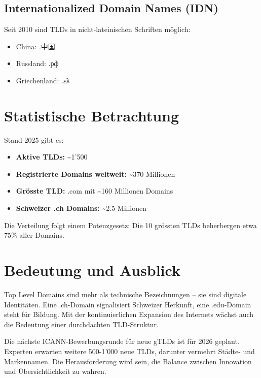 \documentclass[
  nswissgerman,
  a4paper,
  DIV=11,
  numbers=noendperiod,
  ngerman]{scrreprt}
\providecommand{\tightlist}{%
  \setlength{\itemsep}{0pt}\setlength{\parskip}{0pt}}
\begin{document}
\subsection{Internationalized Domain Names
(IDN)}\label{internationalized-domain-names-idn}

Seit 2010 sind TLDs in nicht-lateinischen Schriften möglich:

\begin{itemize}
\tightlist
\item
  China: .中国
\item
  Russland: .рф
\item
  Griechenland: .ελ
\end{itemize}

\section{Statistische Betrachtung}\label{statistische-betrachtung}

Stand 2025 gibt es:

\begin{itemize}
\tightlist
\item
  \textbf{Aktive TLDs:} \textasciitilde1'500
\item
  \textbf{Registrierte Domains weltweit:} \textasciitilde370 Millionen
\item
  \textbf{Grösste TLD:} .com mit \textasciitilde160 Millionen Domains
\item
  \textbf{Schweizer .ch Domains:} \textasciitilde2.5 Millionen
\end{itemize}

Die Verteilung folgt einem Potenzgesetz: Die 10 grössten TLDs
beherbergen etwa 75\% aller Domains.

\section{Bedeutung und Ausblick}\label{bedeutung-und-ausblick}

Top Level Domains sind mehr als technische Bezeichnungen -- sie sind
digitale Identitäten. Eine .ch-Domain signalisiert Schweizer Herkunft,
eine .edu-Domain steht für Bildung. Mit der kontinuierlichen Expansion
des Internets wächst auch die Bedeutung einer durchdachten TLD-Struktur.

Die nächste ICANN-Bewerbungsrunde für neue gTLDs ist für 2026 geplant.
Experten erwarten weitere 500-1'000 neue TLDs, darunter vermehrt Städte-
und Markennamen. Die Herausforderung wird sein, die Balance zwischen
Innovation und Übersichtlichkeit zu wahren.
\end{document}
